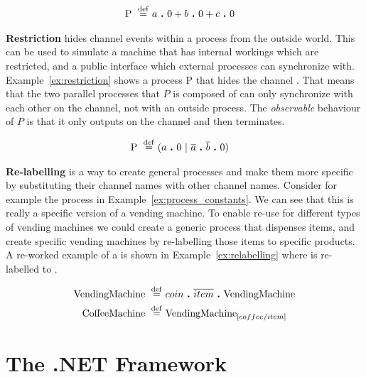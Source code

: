 	\begin{Exa}\label{ex:process_constants}
	\begin{align*}
			\mathrm{P} \ \stackrel{\mathrm{def}}{=}\  & a \ \textbf{.}\  0 + b \ \textbf{.}\  0 + c \ \textbf{.}\  0
	\end{align*}	
	\end{Exa}
	
	\textbf{Restriction} hides channel events within a process from the outside 
	world. This can be used to simulate a machine that has internal workings 
	which are restricted, and a public interface which external processes can	
	synchronize with. Example~\ref{ex:restriction} shows a process P that hides 
	the channel . That means that the two parallel processes that $P$ 
	is composed of can only synchronize with each other on the  
	channel, not with an outside process. The \textit{observable} behaviour of 
	$P$ is that it only outputs on the  channel and then terminates.
	
	\begin{Exa}\label{ex:restriction}
	\begin{align*}
			\mathrm{P} \ \stackrel{\mathrm{def}}{=}\  & (a \ \textbf{.}\  0 \ |\  \overline{a} \ \textbf{.}\  \overline{b} \ \textbf{.}\  0)  			
	\end{align*}	
	\end{Exa}

	\textbf{Re-labelling} is a way to create general processes and make them 
	more specific by substituting their channel names with other channel names. 
	Consider for example the  process in 
	Example~\ref{ex:process_constants}. We can see that this is really a 
	specific version of a vending machine. To enable re-use for different types 
	of vending machines we could create a generic  process 
	that dispenses items, and create specific vending machines by re-labelling 
	those items to specific products. A re-worked example of a 
	 is shown in Example~\ref{ex:relabelling} where 
	 is re-labelled to .
	
	\begin{Exa}\label{ex:relabelling}
	\begin{align*}
			\mathrm{VendingMachine} \ \stackrel{\mathrm{def}}{=}\  & coin \ \textbf{.}\  \overline{item} \ \textbf{.}\  \mathrm{VendingMachine} \\
			\mathrm{CoffeeMachine} \ \stackrel{\mathrm{def}}{=}\  & \mathrm{VendingMachine}_{[coffee/item]}
	\end{align*}	
	\end{Exa}
	
	
\section{The .NET Framework}

